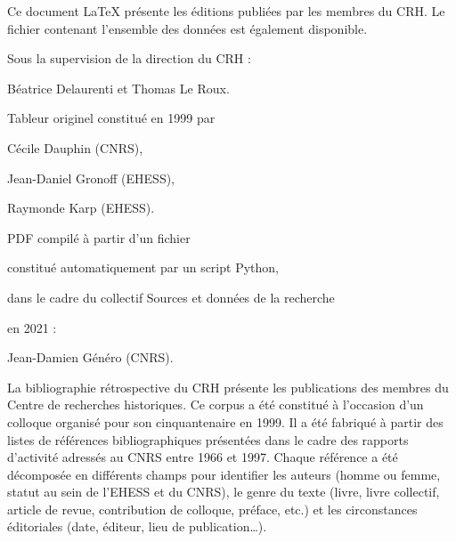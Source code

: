 \documentclass{article}
\begin{document}

\newpage
\thispagestyle{empty}

\begin{center}
	\begin{itshape}
		
		Ce document \LaTeX{} présente les éditions publiées par les membres du CRH. Le fichier  contenant l'ensemble des données est également disponible.
		
		\bigskip
		
		Sous la supervision de la direction du CRH :
		
		Béatrice Delaurenti et Thomas Le Roux.
		
		\medskip
		
		Tableur originel constitué en 1999 par
		
		\medskip
		
		Cécile Dauphin (CNRS),
		
		Jean-Daniel Gronoff (EHESS),
		
		Raymonde Karp (EHESS).
		
		\bigskip
		
		PDF compilé à partir d'un fichier 
		
		constitué automatiquement par un script Python,
		
		dans le cadre du collectif \og Sources et données de la recherche \fg
		
		en 2021 :
		
		\medskip
		
		Jean-Damien Généro (CNRS).
		
		\bigskip
		
		La bibliographie rétrospective du CRH présente les publications des membres du Centre de recherches historiques. Ce corpus a été constitué à l’occasion d’un colloque organisé pour son cinquantenaire en 1999. Il a été fabriqué à partir des listes de références bibliographiques présentées dans le cadre des rapports d’activité adressés au CNRS entre 1966 et 1997. Chaque référence a été décomposée en différents champs pour identifier les auteurs (homme ou femme, statut au sein de l’EHESS et du CNRS), le genre du texte (livre, livre collectif, article de revue, contribution de colloque, préface, etc.) et les circonstances éditoriales (date, éditeur, lieu de publication…). 
		
		\bigskip
		

\end{itshape}
\end{center}
\end{document}
